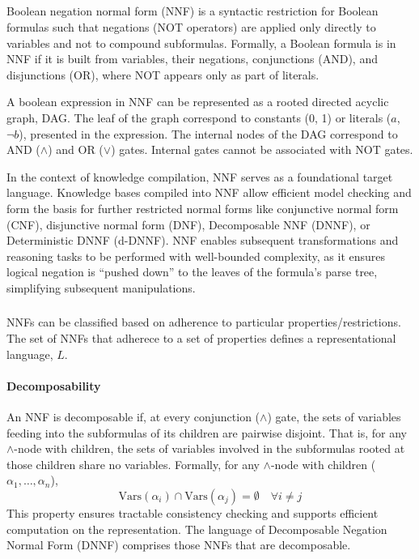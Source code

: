 \subsection{\color{blue}{Negation Normal Form}}
Boolean negation normal form (NNF) is a syntactic restriction for Boolean formulas such that negations (NOT operators) are applied only directly to variables and not to compound subformulas. Formally, a Boolean formula is in NNF if it is built from variables, their negations, conjunctions (AND), and disjunctions (OR), where NOT appears only as part of literals.

A boolean expression in NNF can be represented as a rooted directed acyclic graph, DAG. The leaf of the graph correspond to constants (0, 1) or literals ($a$, $\neg b$), presented in the expression. The internal nodes of the DAG correspond to AND ($\land$) and OR ($\lor$) gates. Internal gates cannot be associated with NOT gates.

In the context of knowledge compilation, NNF serves as a foundational target language. Knowledge bases compiled into NNF allow efficient model checking and form the basis for further restricted normal forms like conjunctive normal form (CNF), disjunctive normal form (DNF), Decomposable NNF (DNNF), or Deterministic DNNF (d-DNNF). NNF enables subsequent transformations and reasoning tasks to be performed with well-bounded complexity, as it ensures logical negation is ``pushed down'' to the leaves of the formula’s parse tree, simplifying subsequent manipulations.

\subsubsection{\color{blue}{Properties of NNF}}
NNFs can be classified based on adherence to particular properties/restrictions. The set of NNFs that adherece to a set of properties defines a representational language, $L$.

\paragraph{Decomposability}
An NNF is decomposable if, at every conjunction ($\land$) gate, the sets of variables feeding into the subformulas of its children are pairwise disjoint. That is, for any $\wedge$-node with children, the sets of variables involved in the subformulas rooted at those children share no variables. 
Formally, for any $\wedge$-node with children ($\alpha_1, \ldots, \alpha_n$),
\[
\mathrm{Vars}(\alpha_i) \cap \mathrm{Vars}(\alpha_j) = \emptyset \quad \forall i \neq j
\]
This property ensures tractable consistency checking and supports efficient computation on the representation. The language of Decomposable Negation Normal Form (DNNF) comprises those NNFs that are decomposable.

